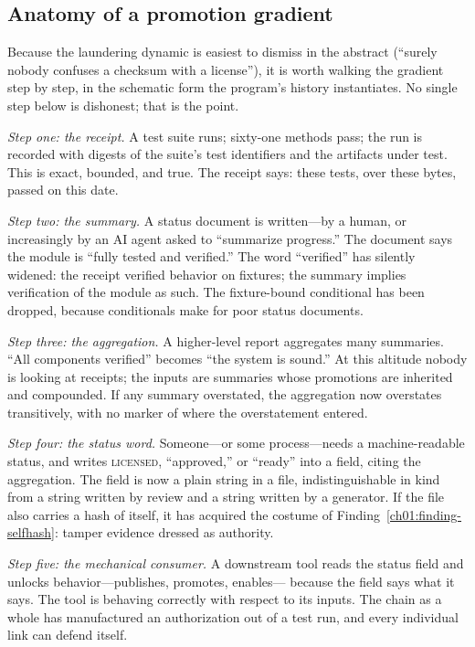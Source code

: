 \subsection{Anatomy of a promotion gradient}\label{ch01:gradient}

Because the laundering dynamic is easiest to dismiss in the abstract
(``surely nobody confuses a checksum with a license''), it is worth
walking the gradient step by step, in the schematic form the program's
history instantiates. No single step below is dishonest; that is the
point.

\emph{Step one: the receipt.} A test suite runs; sixty-one methods
pass; the run is recorded with digests of the suite's test identifiers
and the artifacts under test. This is exact, bounded, and true. The
receipt says: these tests, over these bytes, passed on this date.

\emph{Step two: the summary.} A status document is written---by a
human, or increasingly by an AI agent asked to ``summarize progress.''
The document says the module is ``fully tested and verified.'' The word
``verified'' has silently widened: the receipt verified behavior on
fixtures; the summary implies verification of the module as such. The
fixture-bound conditional has been dropped, because conditionals make
for poor status documents.

\emph{Step three: the aggregation.} A higher-level report aggregates
many summaries. ``All components verified'' becomes ``the system is
sound.'' At this altitude nobody is looking at receipts; the inputs are
summaries whose promotions are inherited and compounded. If any summary
overstated, the aggregation now overstates transitively, with no marker
of where the overstatement entered.

\emph{Step four: the status word.} Someone---or some process---needs a
machine-readable status, and writes \textsc{licensed}, ``approved,'' or
``ready'' into a field, citing the aggregation. The field is now a
plain string in a file, indistinguishable in kind from a string written
by review and a string written by a generator. If the file also carries
a hash of itself, it has acquired the costume of
Finding~\ref{ch01:finding-selfhash}: tamper evidence dressed as
authority.

\emph{Step five: the mechanical consumer.} A downstream tool reads the
status field and unlocks behavior---publishes, promotes, enables---
because the field says what it says. The tool is behaving correctly
with respect to its inputs. The chain as a whole has manufactured an
authorization out of a test run, and every individual link can defend
itself.

